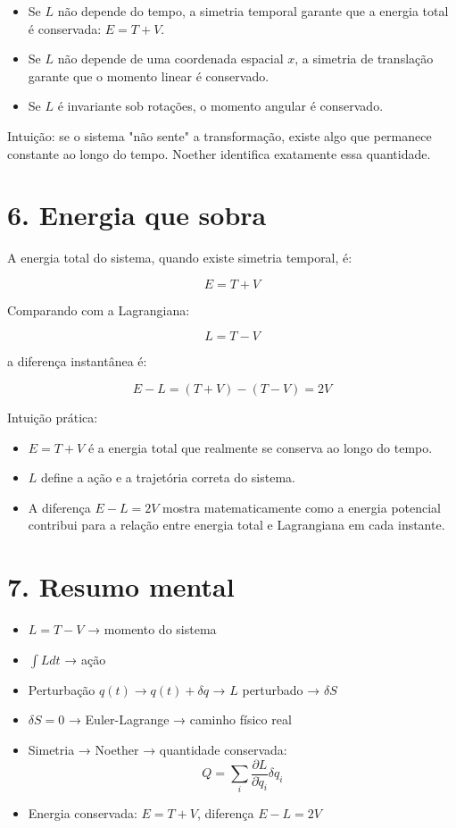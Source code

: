 \documentclass[12pt]{article}
\begin{document}
\begin{itemize}
    \item Se $L$ não depende do tempo, a simetria temporal garante que a energia total é conservada: $E = T + V$.  
    \item Se $L$ não depende de uma coordenada espacial $x$, a simetria de translação garante que o momento linear é conservado.  
    \item Se $L$ é invariante sob rotações, o momento angular é conservado.
\end{itemize}

Intuição: se o sistema "não sente" a transformação, existe algo que permanece constante ao longo do tempo. Noether identifica exatamente essa quantidade.

\section*{6. Energia que sobra}

A energia total do sistema, quando existe simetria temporal, é:

\[
E = T + V
\]

Comparando com a Lagrangiana:

\[
L = T - V
\]

a diferença instantânea é:

\[
E - L = (T + V) - (T - V) = 2V
\]

Intuição prática:

\begin{itemize}
    \item $E = T + V$ é a energia total que realmente se conserva ao longo do tempo.  
    \item $L$ define a ação e a trajetória correta do sistema.  
    \item A diferença $E - L = 2V$ mostra matematicamente como a energia potencial contribui para a relação entre energia total e Lagrangiana em cada instante.  
\end{itemize}

\section*{7. Resumo mental}

\begin{itemize}
    \item $L = T - V$ → momento do sistema
    \item $\int L dt$ → ação
    \item Perturbação $q(t) \to q(t)+\delta q$ → $L$ perturbado → $\delta S$
    \item $\delta S = 0$ → Euler-Lagrange → caminho físico real
    \item Simetria → Noether → quantidade conservada:
    \[
    Q = \sum_i \frac{\partial L}{\partial \dot{q}_i} \delta q_i
    \]
    \item Energia conservada: $E = T + V$, diferença $E - L = 2V$
\end{itemize}
\end{document}
